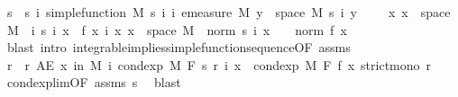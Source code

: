 \begin{isabellebody}
\ s\ \ s{\isacharcolon}{\kern0pt}\ {\isachardoublequoteopen}{\isasymAnd}i{\isachardot}{\kern0pt}\ simple{\isacharunderscore}{\kern0pt}function\ M\ {\isacharparenleft}{\kern0pt}s\ i{\isacharparenright}{\kern0pt}{\isachardoublequoteclose}\ {\isachardoublequoteopen}{\isasymAnd}i{\isachardot}{\kern0pt}\ emeasure\ M\ {\isacharbraceleft}{\kern0pt}y\ {\isasymin}\ space\ M{\isachardot}{\kern0pt}\ s\ i\ y\ {\isasymnoteq}\ {}{\isacharbraceright}{\kern0pt}\ {\isasymnoteq}\ {\isasyminfinity}{\isachardoublequoteclose}\ {\isachardoublequoteopen}{\isasymAnd}x{\isachardot}{\kern0pt}\ x\ {\isasymin}\ space\ M\ {\isasymLongrightarrow}\ {\isacharparenleft}{\kern0pt}{\isasymlambda}i{\isachardot}{\kern0pt}\ s\ i\ x{\isacharparenright}{\kern0pt}\ {\isasymlonglonglongrightarrow}\ f\ x{\isachardoublequoteclose}\ {\isachardoublequoteopen}{\isasymAnd}i\ x{\isachardot}{\kern0pt}\ x\ {\isasymin}\ space\ M\ {\isasymLongrightarrow}\ norm\ {\isacharparenleft}{\kern0pt}s\ i\ x{\isacharparenright}{\kern0pt}\ {\isasymle}\ {}\ {\isacharasterisk}{\kern0pt}\ norm\ {\isacharparenleft}{\kern0pt}f\ x{\isacharparenright}{\kern0pt}{\isachardoublequoteclose}\ \isanewline
\ \ \ \ \isamarkupfalse%
\ {\isacharparenleft}{\kern0pt}blast\ intro{\isacharcolon}{\kern0pt}\ integrable{\isacharunderscore}{\kern0pt}implies{\isacharunderscore}{\kern0pt}simple{\isacharunderscore}{\kern0pt}function{\isacharunderscore}{\kern0pt}sequence{\isacharbrackleft}{\kern0pt}OF\ assms{\isacharbrackright}{\kern0pt}{\isacharparenright}{\kern0pt}\isanewline
\isanewline
\ \ \isamarkupfalse%
\ r\ \ r{\isacharcolon}{\kern0pt}\ {\isachardoublequoteopen}AE\ x\ in\ M{\isachardot}{\kern0pt}\ {\isacharparenleft}{\kern0pt}{\isasymlambda}i{\isachardot}{\kern0pt}\ cond{\isacharunderscore}{\kern0pt}exp\ M\ F\ {\isacharparenleft}{\kern0pt}s\ {\isacharparenleft}{\kern0pt}r\ i{\isacharparenright}{\kern0pt}{\isacharparenright}{\kern0pt}\ x{\isacharparenright}{\kern0pt}\ {\isasymlonglonglongrightarrow}\ cond{\isacharunderscore}{\kern0pt}exp\ M\ F\ f\ x{\isachardoublequoteclose}\ {\isachardoublequoteopen}strict{\isacharunderscore}{\kern0pt}mono\ r{\isachardoublequoteclose}\ \isamarkupfalse%
\ cond{\isacharunderscore}{\kern0pt}exp{\isacharunderscore}{\kern0pt}lim{\isacharbrackleft}{\kern0pt}OF\ assms\ s{\isacharbrackright}{\kern0pt}\ \isamarkupfalse%
\ blast\isanewline
\isanewline
\ \ \isamarkupfalse%

\end{isabellebody}
